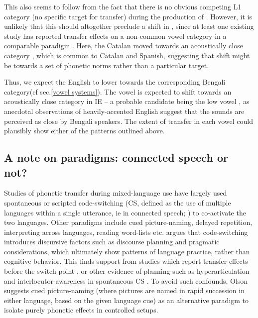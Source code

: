 \documentclass[11pt]{article}
\newcommand{\nt}[1]{\textipa{[#1]}} %
\begin{document}
This also seems to follow from the fact that there is no obvious competing L1 category (no specific target for transfer) during the production of \nt{2}. However, it is unlikely that this should altogether preclude a shift in \nt{2}, since at least one existing study has reported transfer effects on a non-common vowel category in a comparable paradigm \cite{simonet2014phonetic}. Here, the Catalan \nt{O} moved towards an acoustically close category \nt{o}, which is common to Catalan and Spanish, suggesting that shift might be towards a set of phonetic norms rather than a particular target. 

Thus, we expect the English \nt{\ae} to lower towards the corresponding Bengali category(cf sec.\ref{vowel systems}). The vowel \nt{2} is expected to shift towards an acoustically close category in IE -- a probable candidate being the low vowel \nt{a:}, as anecdotal observations of heavily-accented English suggest that the sounds are perceived as close by Bengali speakers. The extent of transfer in each vowel could plausibly show either of the patterns outlined above.


\subsection{A note on paradigms: connected speech or not?}

Studies of phonetic transfer during mixed-language use have largely used spontaneous or scripted code-switching (CS, defined as the use of multiple languages within a single utterance, ie in connected speech; ) to co-activate the two languages. Other paradigms include cued picture-naming, delayed repetition, interpreting across languages, reading word-lists etc.  argues that code-switching introduces discursive factors such as discourse planning and pragmatic considerations, which ultimately show patterns of language practice, rather than cognitive behavior. This finds support from studies which report transfer effects before the switch point \cite{bullock2009trying}, or other evidence of planning such as hyperarticulation \cite{muldner2019phonetics} and interlocutor-awareness in spontaneous CS \cite{khattab2013phonetic}. To avoid such confounds, Olson suggests cued picture-naming (where pictures are named in rapid succession in either language, based on the given language cue) as an alternative paradigm to isolate purely phonetic effects in controlled setups. 
\end{document}
